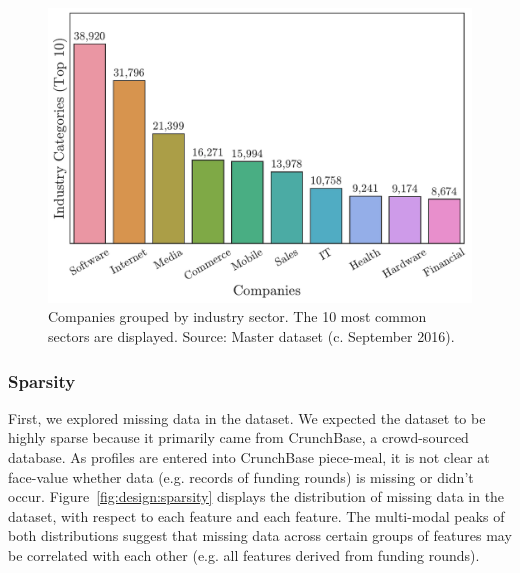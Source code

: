 \documentclass[../thesis/thesis.tex]{subfiles}
\begin{document}
\begin{figure}[!htb]
    \centering
    \includegraphics[width=\textwidth]{../figures/design/industry_counts}
    \caption{Companies grouped by industry sector. The 10 most common sectors are displayed. Source: Master dataset (c. September 2016).}
    \label{fig:design:industry_counts}
\end{figure}

\subsubsection{Sparsity}

First, we explored missing data in the dataset. We expected the dataset to be highly sparse because it primarily came from CrunchBase, a crowd-sourced database. As profiles are entered into CrunchBase piece-meal, it is not clear at face-value whether data (e.g. records of funding rounds) is missing or didn't occur. Figure~\ref{fig:design:sparsity} displays the distribution of missing data in the dataset, with respect to each feature and each feature. The multi-modal peaks of both distributions suggest that missing data across certain groups of features may be correlated with each other (e.g. all features derived from funding rounds).
\end{document}
